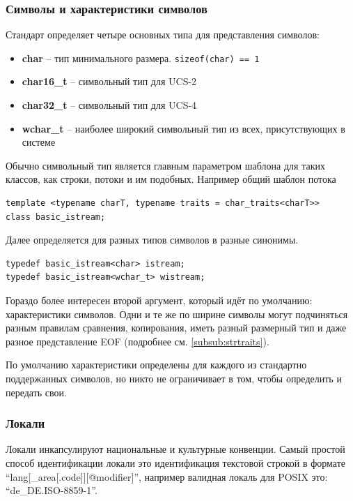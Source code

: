 \documentclass[a4paper,12pt,oneside]{article}
\begin{document}
\subsubsection{Символы и характеристики символов}

Стандарт определяет четыре основных типа для представления символов:

\begin{itemize}
\item \textbf{char} -- тип минимального размера. \lstinline!sizeof(char) == 1!
\item \textbf{char16\_t} -- символьный тип для UCS-2
\item \textbf{char32\_t} -- символьный тип для UCS-4
\item \textbf{wchar\_t} -- наиболее широкий символьный тип из всех, присутствующих в системе
\end{itemize}

Обычно символьный тип является главным параметром шаблона для таких классов, как строки, потоки и им подобных. Например общий шаблон потока

\begin{lstlisting}
template <typename charT, typename traits = char_traits<charT>>
class basic_istream;
\end{lstlisting}

Далее определяется для разных типов символов в разные синонимы.

\begin{lstlisting}
typedef basic_istream<char> istream;
typedef basic_istream<wchar_t> wistream;
\end{lstlisting}

Гораздо более интересен второй аргумент, который идёт по умолчанию: характеристики символов. Одни и те же по ширине символы могут подчиняться разным правилам сравнения, копирования, иметь разный размерный тип и даже разное представление EOF (подробнее см. \ref{subsub:strtraits}).

По умолчанию характеристики определены для каждого из стандартно поддержанных символов, но никто не ограничивает в том, чтобы определить и передать свои.

\subsubsection{Локали}\label{subsubsec:locales}

Локали инкапсулируют национальные и культурные конвенции. Самый простой способ идентификации локали это идентификация текстовой строкой в формате ``lang[\_area[.code]][@modifier]'', например валидная локаль для POSIX это: ``de\_DE.ISO-8859-1''.
\end{document}
